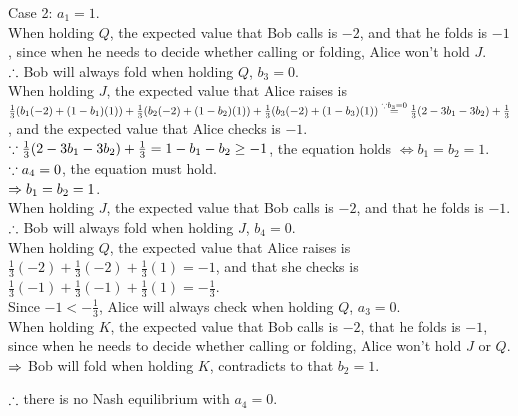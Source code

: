 \begin{pr}
\begin{enumerate}[(a)]
Case 2: $a_1=1$.\\
When holding $Q$, the expected value that Bob calls is $-2$, and that he folds is $-1$, since when he needs to decide whether calling or folding, Alice won't hold $J$.\\
$\therefore$ Bob will always fold when holding $Q$, $b_3=0$.\\
When holding $J$, the expected value that Alice raises is $\frac13(b_1(-2)+(1-b_1)(1))+\frac13(b_2(-2)+(1-b_2)(1))+\frac13(b_3(-2)+(1-b_3)(1))\overset{\because b_3=0}=\frac13(2-3b_1-3b_2)+\frac13$, and the expected value that Alice checks is $-1$.\\
$\because\frac13(2-3b_1-3b_2)+\frac13=1-b_1-b_2\geq-1$, the equation holds $\iff b_1=b_2=1$.\\
$\because a_4=0$, the equation must hold.\\
$\Rightarrow b_1=b_2=1$.\\
When holding $J$, the expected value that Bob calls is $-2$, and that he folds is $-1$.\\
$\therefore$ Bob will always fold when holding $J$, $b_4=0$.\\
When holding $Q$, the expected value that Alice raises is $\frac13(-2)+\frac13(-2)+\frac13(1)=-1$, and that she checks is $\frac13(-1)+\frac13(-1)+\frac13(1)=-\frac13$.\\
Since $-1<-\frac13$, Alice will always check when holding $Q$, $a_3=0$.\\
When holding $K$, the expected value that Bob calls is $-2$, that he folds is $-1$, since when he needs to decide whether calling or folding, Alice won't hold $J$ or $Q$.\\
$\Rightarrow$ Bob will fold when holding $K$, contradicts to that $b_2=1$.

$\therefore$ there is no Nash equilibrium with $a_4=0$.

\end{enumerate}
\end{pr}
